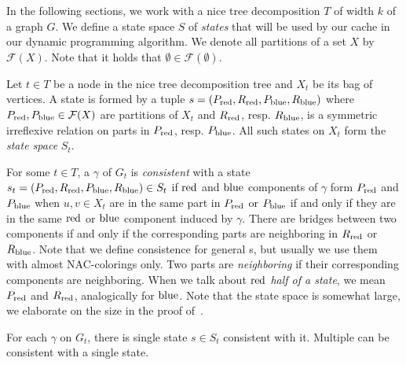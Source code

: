 In the following sections,
we work with a nice tree decomposition \( T \) of width \( k \)
of a graph \( G \).
%
We define a state space \( S \) of \emph{states}
that will be used by our cache in our dynamic programming algorithm.
We denote all partitions of a set \( X \) by \( \mathcal{F}(X) \).
Note that it holds that \( \emptyset \in \mathcal{F}(\emptyset) \).

%
\begin{definition}
	Let \( t \in T \) be a node in the nice tree decomposition tree and
	\( X_t \) be its bag of vertices.
	A state is formed by a tuple \( s = (P_{\text{red}}, R_{\text{red}}, P_{\text{blue}}, R_{\text{blue}}) \)
	where \( P_{\text{red}}, P_{\text{blue}} \in \mathcal{F}(X)\) are partitions of \( X_t \)
	and \( R_{\text{red}}\), resp. \(R_{\text{blue}} \), is a symmetric irreflexive relation
	on parts in \( P_{\text{red}}\), resp. \(P_{\text{blue}} \).
	All such states on \( X_t \) form the \emph{state space} \( S_t \).
\end{definition}
%
For some \( t \in T \), a \rbcol{} \( \gamma \) of \( G_t \)
is \emph{consistent} with a state \( s_t = (P_{\text{red}}, R_{\text{red}}, P_{\text{blue}}, R_{\text{blue}}) \in S_t \)
if \( \text{red} \) and \( \text{blue} \) components of \( \gamma \) form \( P_{\text{red}} \) and \( P_{\text{blue}} \)
when \( u, v \in X_t \) are in the same part in \( P_{\text{red}} \) or \( P_{\text{blue}} \)
if and only if they are in the same \( \text{red} \) or \( \text{blue} \) component induced by \( \gamma \).
There are bridges between two components if and only if
the corresponding parts are neighboring in \( R_{\text{red}} \) or \( R_{\text{blue}} \).
%
Note that we define consistence for general \rbcol{}s,
but usually we use them with almost NAC-colorings only.
%
Two parts are \emph{neighboring} if their corresponding components are neighboring.
When we talk about \emph{\( \text{red} \) half of a state},
we mean \( P_{\text{red}} \) and \( R_{\text{red}} \),
analogically for \( \text{blue} \).
%
Note that the state space is somewhat large,
we elaborate on the size in the proof of~.
%
\begin{observation}
	For each \rbcol{} \( \gamma \) on \( G_t \),
	there is single state \( s \in S_t \) consistent with it.
	Multiple \rbcol{} can be consistent with a single state.
\end{observation}
%

